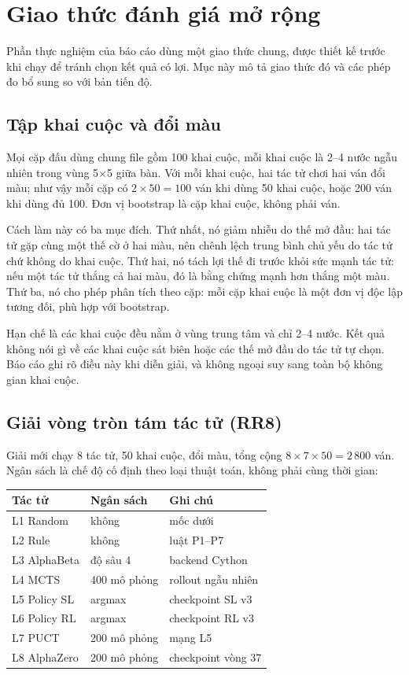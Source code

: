 \section{Giao thức đánh giá mở rộng}
\label{sec:pp-giao-thuc-moi}
Phần thực nghiệm của báo cáo dùng một giao thức chung, được thiết kế trước khi chạy để tránh
chọn kết quả có lợi. Mục này mô tả giao thức đó và các phép đo bổ sung so với bản tiến độ.

\subsection{Tập khai cuộc và đổi màu}
Mọi cặp đấu dùng chung file  gồm 100 khai cuộc, mỗi
khai cuộc là 2--4 nước ngẫu nhiên trong vùng 5×5 giữa bàn. Với mỗi khai cuộc, hai tác tử chơi
hai ván đổi màu; như vậy mỗi cặp có $2 \times 50 = 100$ ván khi dùng 50 khai cuộc, hoặc 200
ván khi dùng đủ 100. Đơn vị bootstrap là cặp khai cuộc, không phải ván.

Cách làm này có ba mục đích. Thứ nhất, nó giảm nhiễu do thế mở đầu: hai tác tử gặp cùng một
thế cờ ở hai màu, nên chênh lệch trung bình chủ yếu do tác tử chứ không do khai cuộc. Thứ hai,
nó tách lợi thế đi trước khỏi sức mạnh tác tử: nếu một tác tử thắng cả hai màu, đó là bằng
chứng mạnh hơn thắng một màu. Thứ ba, nó cho phép phân tích theo cặp: mỗi cặp khai cuộc là một
đơn vị độc lập tương đối, phù hợp với bootstrap.

Hạn chế là các khai cuộc đều nằm ở vùng trung tâm và chỉ 2--4 nước. Kết quả không nói gì về
các khai cuộc sát biên hoặc các thế mở đầu do tác tử tự chọn. Báo cáo ghi rõ điều này khi diễn
giải, và không ngoại suy sang toàn bộ không gian khai cuộc.

\subsection{Giải vòng tròn tám tác tử (RR8)}
\label{sec:pp-rr8}
Giải mới chạy 8 tác tử, 50 khai cuộc, đổi màu, tổng cộng $8 \times 7 \times 50 = 2\,800$ ván.
Ngân sách là chế độ cố định theo loại thuật toán, không phải cùng thời gian:

\begin{center}\small
\begin{tabular}{@{}lll@{}}
\toprule
Tác tử & Ngân sách & Ghi chú \\
\midrule
L1 Random & không & mốc dưới \\
L2 Rule & không & luật P1--P7 \\
L3 AlphaBeta & độ sâu 4 & backend Cython \\
L4 MCTS & 400 mô phỏng & rollout ngẫu nhiên \\
L5 Policy SL & argmax & checkpoint SL v3 \\
L6 Policy RL & argmax & checkpoint RL v3 \\
L7 PUCT & 200 mô phỏng & mạng L5 \\
L8 AlphaZero & 200 mô phỏng & checkpoint vòng 37 \\
\bottomrule
\end{tabular}
\end{center}

